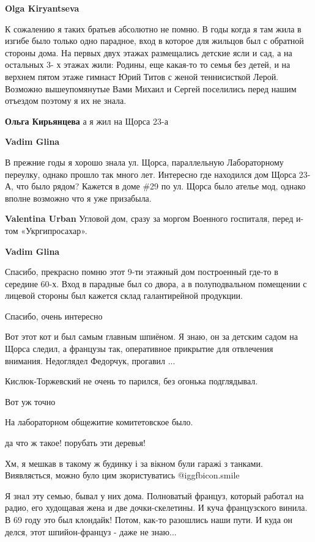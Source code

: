 \begin{itemize}
\begin{itemize}
\begin{itemize}
\textbf{Olga Kiryantseva} 

К сожалению я таких братьев абсолютно не помню. В годы когда я там жила в
изгибе было только одно парадное, вход в которое для жильцов был с обратной
стороны дома. На первых двух этажах размещались детские ясли и сад, а на
остальных 3- х этажах жили: Родины, еще какая-то то семья без детей, и на
верхнем пятом этаже гимнаст Юрий Титов с женой теннисисткой Лерой. Возможно
вышеупомянутые Вами Михаил и Сергей поселились перед нашим отъездом поэтому я
их не знала.


\textbf{Ольга Кирьянцева} а я жил на Щорса 23-а

\textbf{Vadim Glina} 

В прежние годы я хорошо знала ул. Щорса, параллельную Лабораторному переулку,
однако прошло так много лет. Интересно где находился дом Щорса 23-А, что было
рядом? Кажется в доме \#29 по ул. Щорса было ателье мод, однако вполне возможно
что я уже призабыла.

\textbf{Valentina Urban} Угловой дом, сразу за моргом Военного госпиталя, перед и-том «Укргипросахар».

\textbf{Vadim Glina} 

Спасибо, прекрасно помню этот 9-ти этажный дом построенный где-то в середине
60-х. Вход в парадные был со двора, а в полуподвальном помещении с лицевой
стороны был кажется склад галантирейной продукции.

\end{itemize} %

\end{itemize} %

Спасибо, очень интересно


Вот этот кот и был самым главным шпиёном. Я знаю, он за детским садом на Щорса
следил, а французы так, оперативное прикрытие для отвлечения внимания.
Недоглядел Федорчук, прогавил ...

Кислюк-Торжевский не очень то парился, без огонька подглядывал.

Вот уж точно

На лабораторном общежитие комитетовское было.

да что ж такое! порубать эти деревья!

Хм, я мешкав в такому ж будинку і за вікном були гаражі з танками.
Виявляється, можно було цим зкористуватись
 @igg{fbicon.smile} 


Я знал эту семью, бывал у них дома. Полноватый француз, который работал на
радио, его худощавая жена и две дочки-скелетины. И куча французского винила. В
69 году это был клондайк! Потом, как-то разошлись наши пути. И куда он делся,
этот шпийон-француз - даже не знаю...


\end{itemize} %
